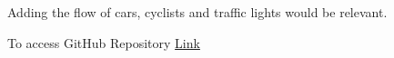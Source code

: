 \documentclass[10pt]{report}
\numberwithin{figure}{section}
\numberwithin{table}{section}
\begin{document}
Adding the flow of cars, cyclists and traffic lights would be relevant.

















\newpage
\printbibliography[title = {References}]

\vspace{5mm} %

To access GitHub Repository \href{https://github.com/brfelipealmeida/ABM_coursework}{Link}
\end{document}
